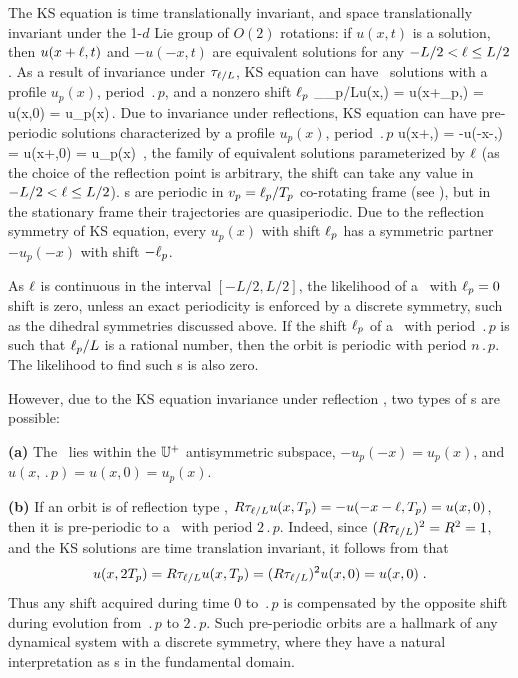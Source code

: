 The KS equation  is time translationally invariant, and
space translationally invariant under the 1-$d$ Lie group of $O(2)$
rotations: if $u(x,t)$ is a solution, then $u(x+\ell,t)$ and
$-u(-x,t)$ are equivalent solutions for any $-L/2 < \ell \leq
L/2$.
As a result of invariance under $\tau_{\ell/L}$,
KS equation can have \rpo\ solutions
with a profile $u_p(x)$, period $\period{p}$, and a
nonzero shift $\ell_p$
\beq
  \Shift_{\shift_p/L}u(x,) =
  u(x+\shift_p,) = u(x,0) = u_p(x)\,.
\label{KSrpos}
\eeq
Due to invariance under reflections, KS equation can have
pre-periodic solutions
characterized by a profile $u_p(x)$,
period $\period{p}$
\beq
  \Refl u(x+\shift,) =
  -u(-x-\shift,) = u(x+\shift,0) = u_p(x)
  \,,
\label{KSpos}
\eeq
the family of equivalent solutions
parameterized by $\ell$
(as the choice of the reflection point is arbitrary,
the shift can take any value in $-L/2 < \ell \leq L/2$).
{\Rpo s}  are periodic in
$v_p=\ell_p/{T_{p}}$ co-rotating frame (see
), but in the stationary frame their
trajectories are quasiperiodic.  Due to the reflection symmetry
 of KS equation, every {\rpo} $u_p(x)$ with shift
$\ell_p$ has a symmetric partner $-u_p(-x)$ with shift $-\ell_p$.

As $\ell$ is continuous in the interval $[-L/2, L/2]$,
the likelihood of a \rpo\ with $\ell_p = 0$ shift is zero,
unless an exact periodicity is enforced by a discrete symmetry,
such as the dihedral symmetries discussed above.
If the shift $\ell_p$ of a \rpo\ with period $\period{p}$ is such
that $\ell_p /L$ is a rational number, then the orbit is
periodic with period $n\period{p}$.  The likelihood to find such \po s is
also zero.

However, due to the KS equation invariance under reflection ,
two types of \po s are possible:

{\bf (a)} The \po\ lies within the  $\mathbb{U}^+$ antisymmetric subspace,
$-u_p(-x) = u_p(x)$, and $u(x,\period{p}) = u(x,0) = u_p(x)$.

{\bf (b)} If an
orbit is of reflection type ,
$R\tau_{\ell/L} u(x,{T_{p}}) =
-u(-x-\ell,{T_{p}}) = u(x,0)$, then it is
pre-periodic to a \po\ with period
$2\period{p}$.
Indeed, since $(R\tau_{\ell/L})^2 = R^2 = 1$,
 and the KS solutions
are time translation invariant, it follows
from  that
\[
  u(x,2{T_{p}}) = R\tau_{\ell/L} u(x,{T_{p}}) =
  (R\tau_{\ell/L})^2 u(x,0) = u(x,0)\;.
\]
Thus any shift acquired during time $0$ to
$\period{p}$ is compensated by the opposite shift during
evolution from $\period{p}$ to $2 \period{p}$.
Such pre-periodic orbits
are a hallmark of any dynamical system with a discrete
symmetry, where they have a natural
interpretation as \po s in the
fundamental domain.

